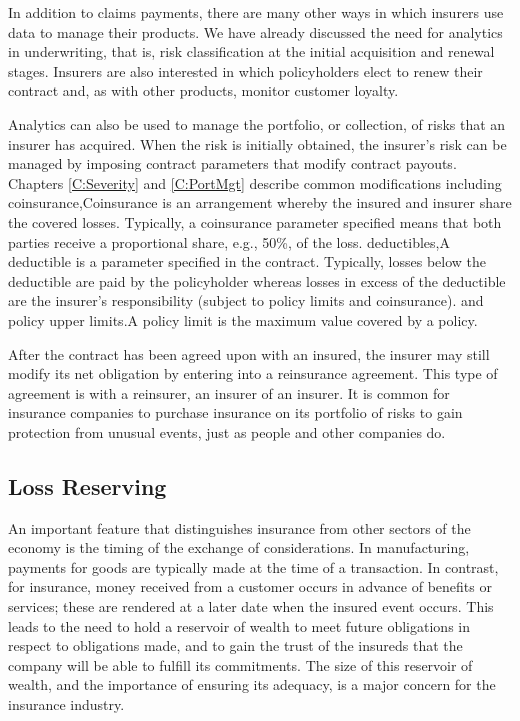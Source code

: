 \documentclass[]{book}
\theoremstyle{definition}
\theoremstyle{definition}
\theoremstyle{definition}
\theoremstyle{remark}
\begin{document}
In addition to claims payments, there are many other ways in which
insurers use data to manage their products. We have already discussed
the need for analytics in underwriting, that is, risk classification at
the initial acquisition and renewal stages. Insurers are also interested
in which policyholders elect to renew their contract and, as with other
products, monitor customer loyalty.

Analytics can also be used to manage the portfolio, or collection, of
risks that an insurer has acquired. When the risk is initially obtained,
the insurer's risk can be managed by imposing contract parameters that
modify contract payouts. Chapters \ref{C:Severity} and \ref{C:PortMgt}
describe common modifications including coinsurance,{Coinsurance is an
arrangement whereby the insured and insurer share the covered losses.
Typically, a coinsurance parameter specified means that both parties
receive a proportional share, e.g., 50\%, of the loss.} deductibles,{A
deductible is a parameter specified in the contract. Typically, losses
below the deductible are paid by the policyholder whereas losses in
excess of the deductible are the insurer's responsibility (subject to
policy limits and coinsurance).} and policy upper limits.{A policy limit
is the maximum value covered by a policy.}

After the contract has been agreed upon with an insured, the insurer may
still modify its net obligation by entering into a reinsurance
agreement. This type of agreement is with a reinsurer, an insurer of an
insurer. It is common for insurance companies to purchase insurance on
its portfolio of risks to gain protection from unusual events, just as
people and other companies do.

\subsection{Loss Reserving}\label{S:Reserving}

An important feature that distinguishes insurance from other sectors of
the economy is the timing of the exchange of considerations. In
manufacturing, payments for goods are typically made at the time of a
transaction. In contrast, for insurance, money received from a customer
occurs in advance of benefits or services; these are rendered at a later
date when the insured event occurs. This leads to the need to hold a
reservoir of wealth to meet future obligations in respect to obligations
made, and to gain the trust of the insureds that the company will be
able to fulfill its commitments. The size of this reservoir of wealth,
and the importance of ensuring its adequacy, is a major concern for the
insurance industry.
\end{document}
